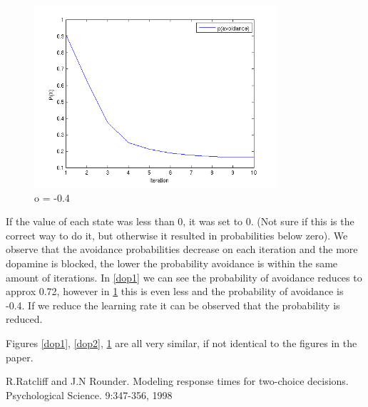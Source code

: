\documentclass[11pt, twocolumn]{report}
\begin{document}
\begin{figure}[H]
\centering
\includegraphics[width=90mm]{assignment2_images/p_av_4.png}
\caption{o = -0.4}
\label{dop3}
\end{figure}

If the value of each state was less than 0, it was set to 0. (Not sure if this is the correct way to do it, but otherwise it resulted in probabilities below zero). We observe that the avoidance probabilities decrease on each iteration and the more dopamine is blocked, the lower the probability avoidance is within the same amount of iterations. In \ref{dop1} we can see the probability of avoidance reduces to approx 0.72, however in \ref{dop3} this is even less and the probability of avoidance is -0.4. If we reduce the learning rate it can be observed that the probability is reduced.

Figures \ref{dop1}, \ref{dop2}, \ref{dop3} are all very similar, if not identical to the figures in the paper. 

\begin{thebibliography}{9}

 R.Ratcliff and J.N Rounder. Modeling response times for two-choice decisions. Psychological Science. 9:347-356, 1998
\end{thebibliography}
\end{document}
